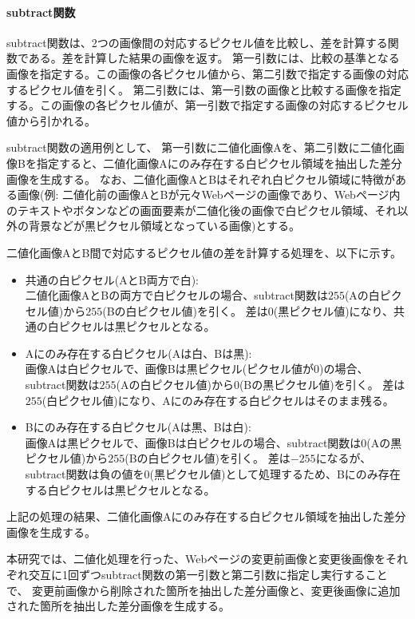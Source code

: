 \paragraph{subtract関数}
subtract関数は、2つの画像間の対応するピクセル値を比較し、差を計算する関数である。差を計算した結果の画像を返す。
第一引数には、比較の基準となる画像を指定する。この画像の各ピクセル値から、第二引数で指定する画像の対応するピクセル値を引く。
第二引数には、第一引数の画像と比較する画像を指定する。この画像の各ピクセル値が、第一引数で指定する画像の対応するピクセル値から引かれる。
\par
subtract関数の適用例として、
第一引数に二値化画像Aを、第二引数に二値化画像Bを指定すると、二値化画像Aにのみ存在する白ピクセル領域を抽出した差分画像を生成する。
なお、二値化画像AとBはそれぞれ白ピクセル領域に特徴がある画像(例: 二値化前の画像AとBが元々Webページの画像であり、Webページ内のテキストやボタンなどの画面要素が二値化後の画像で白ピクセル領域、それ以外の背景などが黒ピクセル領域となっている画像)とする。
\par
二値化画像AとB間で対応するピクセル値の差を計算する処理を、以下に示す。
\begin{itemize}
      \setlength{\itemsep}{0pt}
            \setlength{\parsep}{0pt}
      \item 共通の白ピクセル(AとB両方で白):\\
            二値化画像AとBの両方で白ピクセルの場合、subtract関数は$255$(Aの白ピクセル値)から$255$(Bの白ピクセル値)を引く。
            差は$0$(黒ピクセル値)になり、共通の白ピクセルは黒ピクセルとなる。
      \item Aにのみ存在する白ピクセル(Aは白、Bは黒):\\
            画像Aは白ピクセルで、画像Bは黒ピクセル(ピクセル値が$0$)の場合、subtract関数は$255$(Aの白ピクセル値)から$0$(Bの黒ピクセル値)を引く。
            差は$255$(白ピクセル値)になり、Aにのみ存在する白ピクセルはそのまま残る。
      \item Bにのみ存在する白ピクセル(Aは黒、Bは白):\\
            画像Aは黒ピクセルで、画像Bは白ピクセルの場合、subtract関数は$0$(Aの黒ピクセル値)から$255$(Bの白ピクセル値)を引く。
            差は$-255$になるが、subtract関数は負の値を$0$(黒ピクセル値)として処理するため、Bにのみ存在する白ピクセルは黒ピクセルとなる。
\end{itemize}
上記の処理の結果、二値化画像Aにのみ存在する白ピクセル領域を抽出した差分画像を生成する。
\par
本研究では、二値化処理を行った、Webページの変更前画像と変更後画像をそれぞれ交互に1回ずつsubtract関数の第一引数と第二引数に指定し実行することで、
変更前画像から削除された箇所を抽出した差分画像と、変更後画像に追加された箇所を抽出した差分画像を生成する。

